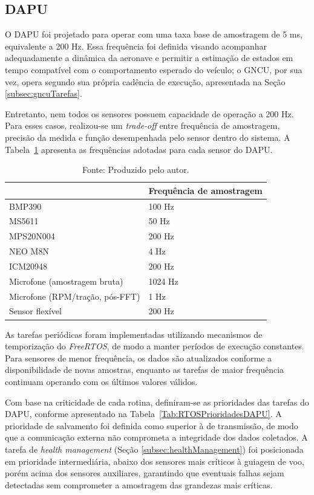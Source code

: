 \subsection{DAPU}
\label{subsec:DAPU}

O DAPU foi projetado para operar com uma taxa base de amostragem de 5 ms, equivalente a 200 Hz. Essa frequência foi definida visando acompanhar adequadamente a dinâmica da aeronave e permitir a estimação de estados em tempo compatível com o comportamento esperado do veículo; o GNCU, por sua vez, opera segundo sua própria cadência de execução, apresentada na Seção \ref{subsec:gncuTarefas}.

Entretanto, nem todos os sensores possuem capacidade de operação a 200 Hz. Para esses casos, realizou-se um \textit{trade-off} entre frequência de amostragem, precisão da medida e função desempenhada pelo sensor dentro do sistema. A Tabela~\ref{Tab:Freqsensores} apresenta as frequências adotadas para cada sensor do DAPU.

\begin{table}[H]
\centering
\caption{Frequência de operação de cada sensor do DAPU.}
\begin{tabular}{|l|l|}
\hline
\rowcolor[HTML]{C0C0C0} 
\multicolumn{1}{|c|}{\textbf{Sensor}} &
\multicolumn{1}{c|}{\textbf{Frequência de amostragem}} \\ \hline
BMP390 & 100 Hz \\ \hline
MS5611 & 50 Hz \\ \hline
MPS20N004 & 200 Hz \\ \hline
NEO M8N & 4 Hz \\ \hline
ICM20948 & 200 Hz \\ \hline
Microfone (amostragem bruta) & 1024 Hz \\ \hline
Microfone (RPM/tração, pós-FFT) & 1 Hz \\ \hline
Sensor flexível & 200 Hz \\ \hline
\end{tabular}
\label{Tab:Freqsensores}
\caption*{Fonte: Produzido pelo autor.}
\end{table}

As tarefas periódicas foram implementadas utilizando mecanismos de temporização do \textit{FreeRTOS}, de modo a manter períodos de execução constantes. Para sensores de menor frequência, os dados são atualizados conforme a disponibilidade de novas amostras, enquanto as tarefas de maior frequência continuam operando com os últimos valores válidos.

Com base na criticidade de cada rotina, definiram-se as prioridades das tarefas do DAPU, conforme apresentado na Tabela~\ref{Tab:RTOSPrioridadesDAPU}. A prioridade de salvamento foi definida como superior à de transmissão, de modo que a comunicação externa não comprometa a integridade dos dados coletados. A tarefa de \textit{health management} (Seção \ref{subsec:healthManagement}) foi posicionada em prioridade intermediária, abaixo dos sensores mais críticos à guiagem de voo, porém acima dos sensores auxiliares, garantindo que eventuais falhas sejam detectadas sem comprometer a amostragem das grandezas mais críticas.

